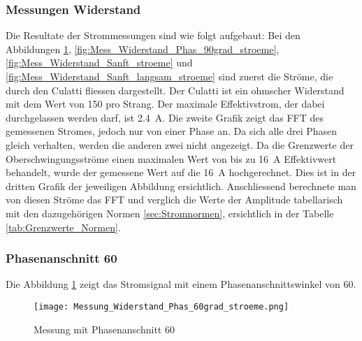 \subsubsection{Messungen Widerstand}

Die Resultate der Strommessungen sind wie folgt aufgebaut: Bei den Abbildungen \ref{fig:Mess_Widerstand_Phas_60grad_stroeme}, \ref{fig:Mess_Widerstand_Phas_90grad_stroeme}, \ref{fig:Mess_Widerstand_Sanft_stroeme} und \ref{fig:Mess_Widerstand_Sanft_langsam_stroeme} sind zuerst die Ströme, die durch den Culatti fliessen dargestellt. Der Culatti ist ein ohmscher Widerstand mit dem Wert von \SI{150}{\Omega} pro Strang. Der maximale Effektivstrom, der dabei durchgelassen werden darf, ist \SI{2.4}{A}. Die zweite Grafik zeigt das FFT des gemessenen Stromes, jedoch nur von einer Phase an. Da sich alle drei Phasen gleich verhalten, werden die anderen zwei nicht angezeigt. Da die Grenzwerte der Oberschwingungsströme einen maximalen Wert von bis zu \SI{16}{A} Effektivwert behandelt, wurde der gemessene Wert auf die \SI{16}{A} hochgerechnet. Dies ist in der dritten Grafik der jeweiligen Abbildung ersichtlich. Anschliessend berechnete man von diesen Ströme das FFT und verglich die Werte der Amplitude tabellarisch mit den dazugehörigen Normen \ref{sec:Stromnormen}, ersichtlich in der Tabelle \ref{tab:Grenzwerte_Normen}.

\subsubsection*{Phasenanschnitt 60\textdegree}

Die Abbildung \ref{fig:Mess_Widerstand_Phas_60grad_stroeme} zeigt das Stromsignal mit einem Phasenanschnittswinkel von 60\textdegree \hspace{0.02cm}. 

\begin{figure}[ht!]
	\centering
	\texttt{[image: Messung\_Widerstand\_Phas\_60grad\_stroeme.png]}	
	\caption{Messung mit Phasenanschnitt 60\textdegree}\label{fig:Mess_Widerstand_Phas_60grad_stroeme}
\end{figure}


